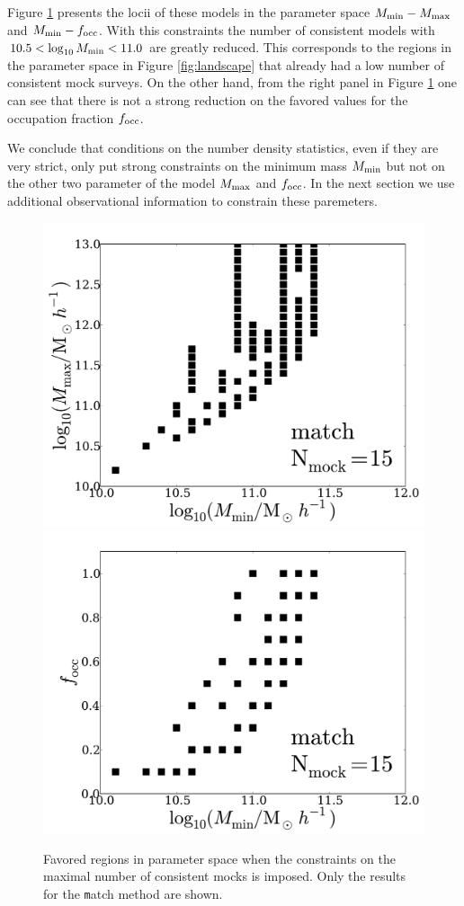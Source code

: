 \documentclass[usenatbib]{mn2e}
\begin{document}
Figure \ref{fig:restriction_mock} presents the locii of these models
in the parameter space $M_{\rm min}-M_{\rm max}$ and $M_{\rm
  min}-f_{\rm occ}$. With this constraints the
number of consistent models with  $10.5 < \log_{10}M_{\rm min}< 11.0$ are
greatly reduced. This corresponds to the regions in the parameter
space in Figure \ref{fig:landscape} that already had a low number of
consistent mock surveys. On the other hand, from the right panel in
Figure \ref{fig:restriction_mock} one can see that there is not a
strong reduction on the favored values for the occupation fraction
$f_{\rm occ}$. 

We conclude that conditions on the number density statistics, even if they are
very strict, only put strong constraints on the minimum mass $M_{\rm
  min}$ but not on the other two parameter of the model $M_{\rm max}$
and $f_{\rm occ}$. In the next section we use additional observational
information to constrain these paremeters.

\begin{figure}
\begin{center}
\includegraphics[width=0.46\linewidth,angle=0]{./plots/Fig5_match_mass_mock.pdf} 
\hspace{5mm}
\includegraphics[width=0.46\linewidth,angle=0]{./plots/Fig5_match_f_occ_mock.pdf}
\end{center}  
\caption{Favored regions in parameter space when the constraints on
  the maximal number of consistent mocks is imposed. Only the results
  for the {\texttt match} method are shown.
  \label{fig:restriction_mock}}  
\end{figure}
\end{document}

